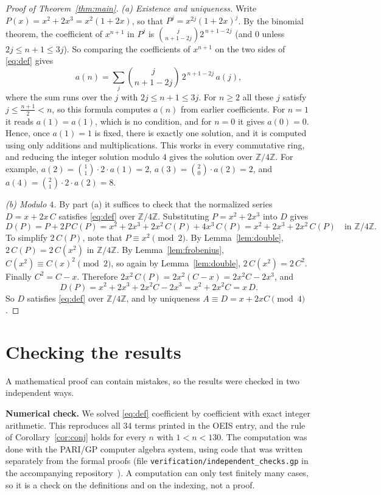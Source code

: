 \documentclass[11pt,a4paper]{article}
\theoremstyle{definition}
\theoremstyle{remark}
\newcommand{\Z}{\mathbb{Z}}
\newcommand{\para}[1]{\par\medskip\noindent\textbf{#1}\enspace}
\begin{document}
\begin{proof}[Proof of Theorem~\ref{thm:main}]
\emph{(a) Existence and uniqueness.} Write $P(x)=x^2+2x^3=x^2(1+2x)$, so that $P^j=x^{2j}(1+2x)^j$. By the binomial
theorem, the coefficient of $x^{n+1}$ in $P^j$ is $\binom{j}{n+1-2j}2^{\,n+1-2j}$ (and $0$ unless
$2j\le n+1\le3j$). So comparing the coefficients of $x^{n+1}$ on the two sides of \eqref{eq:def} gives
\[
a(n)=\sum_{j}\binom{j}{n+1-2j}\,2^{\,n+1-2j}\,a(j),
\]
where the sum runs over the $j$ with $2j\le n+1\le 3j$. For $n\ge2$ all these $j$ satisfy $j\le\frac{n+1}2<n$, so this
formula computes $a(n)$ from earlier coefficients. For $n=1$ it reads $a(1)=a(1)$, which is no condition, and for $n=0$
it gives $a(0)=0$. Hence, once $a(1)=1$ is fixed, there is exactly one solution, and it is computed using only additions
and multiplications. This works in every commutative ring, and reducing the integer solution modulo $4$ gives the solution
over $\Z/4\Z$. For example, $a(2)=\binom11\cdot2\cdot a(1)=2$, $a(3)=\binom20\cdot a(2)=2$, and
$a(4)=\binom21\cdot2\cdot a(2)=8$.

\emph{(b) Modulo $4$.} By part (a) it suffices to check that the normalized series $D=x+2x\,C$ satisfies
\eqref{eq:def} over $\Z/4\Z$. Substituting $P=x^2+2x^3$ into $D$ gives
\[
D(P)=P+2P\,C(P)=x^2+2x^3+2x^2\,C(P)+4x^3\,C(P)=x^2+2x^3+2x^2\,C(P)\quad\text{in }\Z/4\Z .
\]
To simplify $2\,C(P)$, note that $P\equiv x^2\pmod2$. By Lemma~\ref{lem:double}, $2\,C(P)=2\,C(x^2)$ in $\Z/4\Z$. By
Lemma~\ref{lem:frobenius}, $C(x^2)\equiv C(x)^2\pmod 2$, so again by Lemma~\ref{lem:double}, $2\,C(x^2)=2\,C^2$. Finally
$C^2=C-x$. Therefore $2x^2\,C(P)=2x^2(C-x)=2x^2C-2x^3$, and
\[
D(P)=x^2+2x^3+2x^2C-2x^3=x^2+2x^2C=x\,D .
\]
So $D$ satisfies \eqref{eq:def} over $\Z/4\Z$, and by uniqueness $A\equiv D=x+2xC\pmod4$.
\end{proof}

\section{Checking the results}\label{sec:checks}

A mathematical proof can contain mistakes, so the results were checked in two independent ways.

\para{Numerical check.}
We solved \eqref{eq:def} coefficient by coefficient with exact integer arithmetic. This reproduces all 34 terms
printed in the OEIS entry, and the rule of Corollary~\ref{cor:conj} holds for every $n$ with $1<n<130$.
The computation was done with the PARI/GP computer algebra system, using code that was written separately from the
formal proofs (file \texttt{verification/independent\_checks.gp} in the accompanying repository~\cite{repo}).
A computation can only test finitely many cases, so it is a check on the definitions and on the indexing, not a proof.
\end{document}
